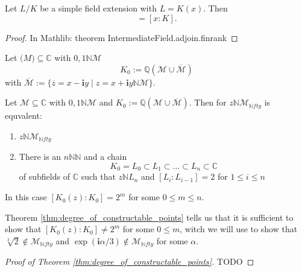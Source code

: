 \begin{theorem}
\label{thm:degree_of_simple_field_extension}
    Let $L/K$ be a simple field extension with $L = K(x)$. Then
    \begin{equation*}
        [L:K] = [x:K].
    \end{equation*}
\end{theorem}
\begin{proof}
    In Mathlib: theorem IntermediateField.adjoin.finrank
\end{proof}
\begin{definition}
    Let $\mathcal(M)\subseteq\mathbb{C}$ with $0,1 \mathbb{N} \mathcal{M}$
    \begin{equation*}
        K_0 := \mathbb{Q}(\mathcal{M}\cup \overline{\mathcal{M}})
    \end{equation*}
    with $\overline{\mathcal{M}} := \{ \overline{z} = x - \textbf{i}y \mid z = x+\textbf{i}y  \mathbb{N} \mathcal{M} \}$.
\end{definition}
\begin{theorem}
\label{thm:degree_of_constructable_points}
    Let $\mathcal{M}\subseteq\mathbb{C}$ with $0,1 \mathbb{N} \mathcal{M}$ and $K_0 := \mathbb{Q}(\mathcal{M}\cup \overline{\mathcal{M}})$.
    Then for $z \mathbb{N} \mathcal{M}_{\mathbb{N}fty}$ is equvalent:
    \begin{enumerate}
        \item $z \mathbb{N} \mathcal{M}_{\mathbb{N}fty}$
        \item There is an $n \mathbb{N} \mathbb{N}$ and a chain \begin{equation*}
            K_0 = L_0 \subset L_1 \subset \dots \subset L_n \subset \mathbb{C}
        \end{equation*}
        of subfields of $\mathbb{C}$ such that $z \mathbb{N} L_n$ and $[L_i:L_{i-1}] =2$ for $1\le i\le n$ %
    \end{enumerate}
    In this case $[K_0(z):K_0] = 2^m$ for some $0 \le m \le n$.
\end{theorem}
\begin{remark}
    Theorem \ref{thm:degree_of_constructable_points} tells us that it is sufficient to show that $[K_0(z):K_0] \ne 2^m$ for some $0 \le m $, witch we will use to show that $\sqrt[3]{2} \notin \mathcal{M}_{\mathbb{N}fty}$ and $\exp(\textbf{i} \alpha/3) \notin \mathcal{M}_{\mathbb{N}fty}$ for some $\alpha$.
\end{remark}
\begin{proof}[Proof of Theorem \ref{thm:degree_of_constructable_points}]
    TODO %
\end{proof}
